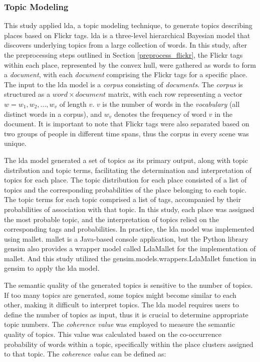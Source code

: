 \documentclass{article}
\theoremstyle{definition}
\theoremstyle{remark}
\begin{document}
\subsubsection{Topic Modeling}
This study applied \acrfull{lda}, a topic modeling technique, to generate topics describing places based on Flickr tags. \acrshort{lda} is a three-level hierarchical Bayesian model that discovers underlying topics from a large collection of words. In this study, after the preprocessing steps outlined in Section \ref{preprocess_flickr}, the Flickr tags within each place, represented by the convex hull, were gathered as words to form a \textit{document}, with each \textit{document} comprising the Flickr tags for a specific place. The input to the \acrshort{lda} model is a \textit{corpus} consisting of \textit{documents}. The \textit{corpus} is structured as a $word \times document$ matrix, with each row representing a vector $w = {w_{1}, w_{2}, ..., w_{v}}$ of length $v$. $v$ is the number of words in the \textit{vocabulary} (all distinct words in a corpus), and $w_{v}$ denotes the frequency of word $v$ in the document. It is important to note that Flickr tags were also separated based on two groups of people in different time spans, thus the corpus in every scene was unique.

The \acrshort{lda} model generated a set of topics as its primary output, along with topic distribution and topic terms, facilitating the determination and interpretation of topics for each place. The topic distribution for each place consisted of a list of topics and the corresponding probabilities of the place belonging to each topic. The topic terms for each topic comprised a list of tags, accompanied by their probabilities of association with that topic. In this study, each place was assigned the most probable topic, and the interpretation of topics relied on the corresponding tags and probabilities. In practice, the \acrshort{lda} model was implemented using \acrfull{mallet}. \acrshort{mallet} is a Java-based console application, but the Python library gensim \citep{rehurek_software_2010} also provides a wrapper model called LdaMallet for the implementation of \acrshort{mallet}. And this study utilized the gensim.models.wrappers.LdaMallet function in gensim to apply the \acrshort{lda} model.

The semantic quality of the generated topics is sensitive to the number of topics. If too many topics are generated, some topics might become similar to each other, making it difficult to interpret topics. The \acrshort{lda} model requires users to define the number of topics as input, thus it is crucial to determine appropriate topic numbers. The \textit{coherence value} was employed to measure the semantic quality of topics. This value was calculated based on the co-occurrence probability of words within a topic, specifically within the place clusters assigned to that topic. The \textit{coherence value} can be defined as:
\end{document}
